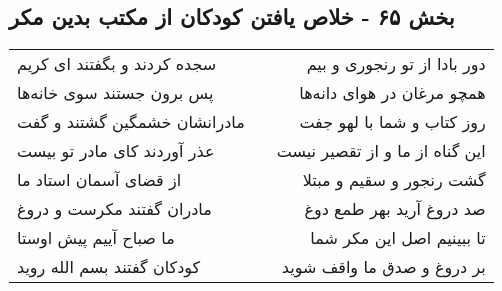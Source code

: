 \begin{center}
\section*{بخش ۶۵ - خلاص یافتن کودکان از مکتب بدین مکر}
\label{sec:sh065}
\begin{longtable}{l p{0.5cm} r}
سجده کردند و بگفتند ای کریم
&&
دور بادا از تو رنجوری و بیم
\\
پس برون جستند سوی خانه‌ها
&&
همچو مرغان در هوای دانه‌ها
\\
مادرانشان خشمگین گشتند و گفت
&&
روز کتاب و شما با لهو جفت
\\
عذر آوردند کای مادر تو بیست
&&
این گناه از ما و از تقصیر نیست
\\
از قضای آسمان استاد ما
&&
گشت رنجور و سقیم و مبتلا
\\
مادران گفتند مکرست و دروغ
&&
صد دروغ آرید بهر طمع دوغ
\\
ما صباح آییم پیش اوستا
&&
تا ببینیم اصل این مکر شما
\\
کودکان گفتند بسم الله روید
&&
بر دروغ و صدق ما واقف شوید
\\
\end{longtable}
\end{center}
